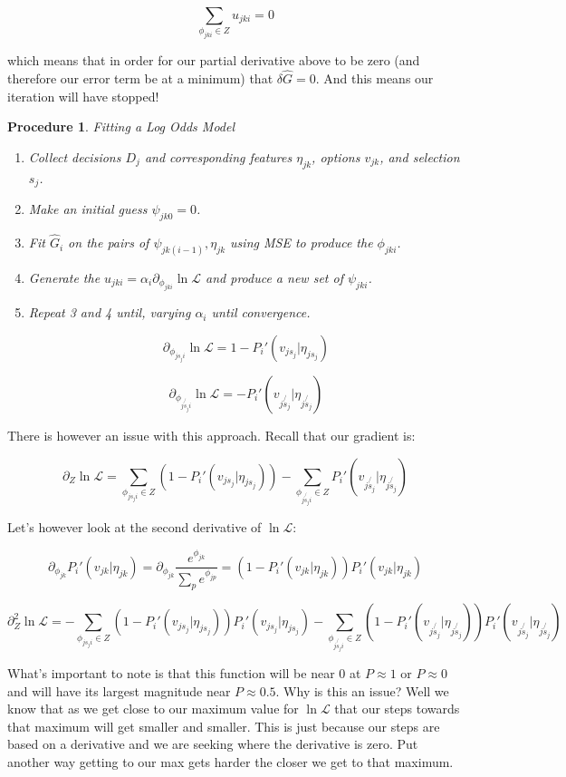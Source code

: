 \documentclass[11pt]{article}
\newtheorem{procedure}{Procedure}
\begin{document}
$$\sum_{\phi_{jki} \in Z} u_{jki} = 0$$

which means that in order for our partial derivative above to be zero (and therefore our error term be at a minimum) that $\delta \hat{G}=0$. And this means our iteration will have stopped! 

\newpage

\begin{procedure}{Fitting a Log Odds Model}
\begin{enumerate}
\item Collect decisions $D_j$ and corresponding features $\eta_{jk}$, options $v_{jk}$, and selection $s_j$. 
\item Make an initial guess $\psi_{jk0} = 0$.
\item Fit $\hat{G}_i$ on the pairs of $\psi_{jk(i-1)},\eta_{jk}$ using MSE to produce the $\phi_{jki}$.
\item Generate the $u_{jki} = \alpha_i \partial_{\phi_{jki}} \ln{\mathcal{L}}$ and produce a new set of $\psi_{jki}$.
\item Repeat 3 and 4 until, varying $\alpha_i$ until convergence. 

$$\partial_{\phi_{js_ji}}\ln{\mathcal{L}}=1-P_i'(v_{js_j} | \eta_{js_j})$$ 

$$\partial_{\phi_{j\not{s_j}i}}\ln{\mathcal{L}}=-P_i'(v_{j\not{s_j}} | \eta_{j\not{s_j}})$$ 
\end{enumerate}

\end{procedure}

There is however an issue with this approach. Recall that our gradient is:

$$\partial_Z \ln{\mathcal{L}}=\sum_{\phi_{js_ji} \in Z}\left(1-P_i'(v_{js_j} | \eta_{js_j}) \right)-\sum_{\phi_{j\not{s_j}i}\in Z}P_i'(v_{j\not{s_j}} | \eta_{j\not{s_j}})$$

Let's however look at the second derivative of $\ln{\mathcal{L}}$:

$$\partial_{\phi_{jk}} P_i'(v_{jk} | \eta_{jk})=\partial_{\phi_{jk}} \frac{e^{\phi_{jk}}}{\sum_p e^{\phi_{jp}}}=(1-P_i'(v_{jk} | \eta_{jk}))P_i'(v_{jk} | \eta_{jk})$$


$$\partial^2_Z \ln{\mathcal{L}}=-\sum_{\phi_{js_ji} \in Z}\left(1-P_i'(v_{js_j} | \eta_{js_j}) \right)P_i'(v_{js_j} | \eta_{js_j})-\sum_{\phi_{j\not{s_j}i}\in Z}\left(1-P_i'(v_{j\not{s_j}} | \eta_{j\not{s_j}}) \right)P_i'(v_{j\not{s_j}} | \eta_{j\not{s_j}})$$

What's important to note is that this function will be near 0 at $P\approx 1$ or $P\approx 0$ and will have its largest magnitude near $P \approx 0.5$. Why is this an issue? Well we know that as we get close to our maximum value for $\ln{\mathcal{L}}$ that our steps towards that maximum will get smaller and smaller. This is just because our steps are based on a derivative and we are seeking where the derivative is zero. Put another way getting to our max gets harder the closer we get to that maximum. 
\end{document}
